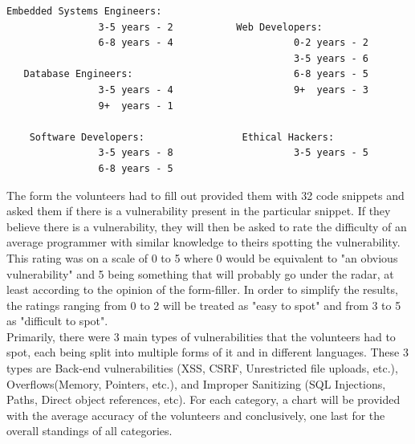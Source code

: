 \begin{lstlisting}[columns=fixed, basewidth=0.5em, basicstyle={\ttfamily},nolol]
Embedded Systems Engineers:             
                3-5 years - 2           Web Developers:
                6-8 years - 4                     0-2 years - 2
                                                  3-5 years - 6
   Database Engineers:                            6-8 years - 5
                3-5 years - 4                     9+  years - 3
                9+  years - 1                   
                                            
    Software Developers:                 Ethical Hackers:
                3-5 years - 8                     3-5 years - 5
                6-8 years - 5

\end{lstlisting}
\vspace{0.3cm}
\noindent The form the volunteers had to fill out provided them with 32 code snippets and asked them if there is a vulnerability present in the particular snippet. If they believe there is a vulnerability, they will then be asked to rate the difficulty of an average programmer with similar knowledge to theirs spotting the vulnerability. This rating was on a scale of 0 to 5 where 0 would be equivalent to "an obvious vulnerability" and 5 being something that will probably go under the radar, at least according to the opinion of the form-filler. In order to simplify the results, the ratings ranging from 0 to 2 will be treated as "easy to spot" and from 3 to 5 as "difficult to spot".\\

\noindent Primarily, there were 3 main types of vulnerabilities that the volunteers had to spot, each being split into multiple forms of it and in different languages. These 3 types are Back-end vulnerabilities (XSS, CSRF, Unrestricted file uploads, etc.), Overflows(Memory, Pointers, etc.), and Improper Sanitizing (SQL Injections, Paths, Direct object references, etc). For each category, a chart will be provided with the average accuracy of the volunteers and conclusively, one last for the overall standings of all categories.

